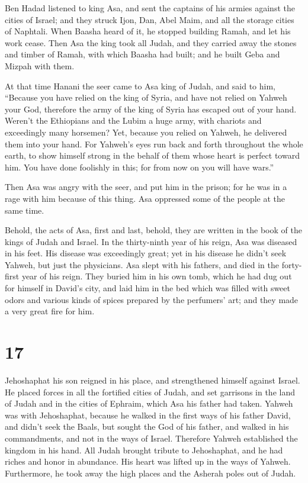  Ben Hadad listened to king Asa, and sent the captains of
his armies against the cities of Israel; and they struck Ijon, Dan, Abel
Maim, and all the storage cities of Naphtali.  When Baasha
heard of it, he stopped building Ramah, and let his work cease.
 Then Asa the king took all Judah, and they carried away
the stones and timber of Ramah, with which Baasha had built; and he
built Geba and Mizpah with them.

 At that time Hanani the seer came to Asa king of Judah,
and said to him, ``Because you have relied on the king of Syria, and
have not relied on Yahweh your God, therefore the army of the king of
Syria has escaped out of your hand.  Weren't the
Ethiopians and the Lubim a huge army, with chariots and exceedingly many
horsemen? Yet, because you relied on Yahweh, he delivered them into your
hand.  For Yahweh's eyes run back and forth throughout the
whole earth, to show himself strong in the behalf of them whose heart is
perfect toward him. You have done foolishly in this; for from now on you
will have wars.''

 Then Asa was angry with the seer, and put him in the
prison; for he was in a rage with him because of this thing. Asa
oppressed some of the people at the same time.

 Behold, the acts of Asa, first and last, behold, they
are written in the book of the kings of Judah and Israel.
 In the thirty-ninth year of his reign, Asa was diseased
in his feet. His disease was exceedingly great; yet in his disease he
didn't seek Yahweh, but just the physicians.  Asa slept
with his fathers, and died in the forty-first year of his reign.
 They buried him in his own tomb, which he had dug out
for himself in David's city, and laid him in the bed which was filled
with sweet odors and various kinds of spices prepared by the perfumers'
art; and they made a very great fire for him.

\hypertarget{section-16}{%
\section{17}\label{section-16}}

 Jehoshaphat his son reigned in his place, and
strengthened himself against Israel.  He placed forces in
all the fortified cities of Judah, and set garrisons in the land of
Judah and in the cities of Ephraim, which Asa his father had taken.
 Yahweh was with Jehoshaphat, because he walked in the
first ways of his father David, and didn't seek the Baals,
 but sought the God of his father, and walked in his
commandments, and not in the ways of Israel.  Therefore
Yahweh established the kingdom in his hand. All Judah brought tribute to
Jehoshaphat, and he had riches and honor in abundance. 
His heart was lifted up in the ways of Yahweh. Furthermore, he took away
the high places and the Asherah poles out of Judah.

